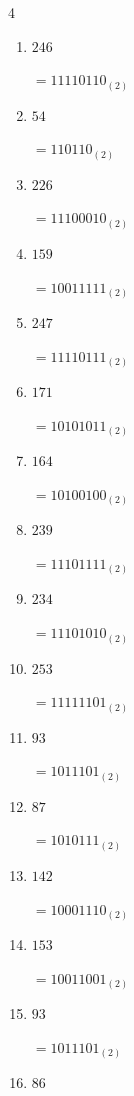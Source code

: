 \begin{multicols}{4}
\begin{enumerate}
        $=10000110_{(2)}$

  \item $246$

        $=11110110_{(2)}$

  \item $54$

        $=110110_{(2)}$

  \item $226$

        $=11100010_{(2)}$

  \item $159$

        $=10011111_{(2)}$

  \item $247$

        $=11110111_{(2)}$

  \item $171$

        $=10101011_{(2)}$

  \item $164$

        $=10100100_{(2)}$

  \item $239$

        $=11101111_{(2)}$

  \item $234$

        $=11101010_{(2)}$

  \item $253$

        $=11111101_{(2)}$

\columnbreak %

  \item $93$

        $=1011101_{(2)}$

  \item $87$

        $=1010111_{(2)}$

  \item $142$

        $=10001110_{(2)}$

  \item $153$

        $=10011001_{(2)}$

  \item $93$

        $=1011101_{(2)}$

  \item $86$


\end{enumerate}
\end{multicols}
